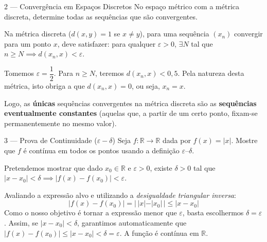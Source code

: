 \begin{exercisebox}{2 --- Convergência em Espaços Discretos}
  No espaço métrico com a métrica discreta, determine todas as sequências que são convergentes.
\end{exercisebox}
\begin{solbox}
  Na métrica discreta ($d(x,y)=1$ se $x \neq y$), para uma sequência $(x_n)$ convergir para um ponto $x$, deve satisfazer: para qualquer $\varepsilon > 0$, $\exists N$ tal que $n \ge N \implies d(x_n, x) < \varepsilon$.
  
  Tomemos $\varepsilon = \dfrac{1}{2}$. Para $n \ge N$, teremos $d(x_n, x) < 0{,}5$. Pela natureza desta métrica, isto obriga a que $d(x_n, x) = 0$, ou seja, $x_n = x$.
  
  Logo, as \textbf{únicas} sequências convergentes na métrica discreta são as \textbf{sequências eventualmente constantes} (aquelas que, a partir de um certo ponto, fixam-se permanentemente no mesmo valor).
\end{solbox}

\begin{exercisebox}{3 --- Prova de Continuidade ($\varepsilon-\delta$)}
  Seja $f:\mathbb{R}\to\mathbb{R}$ dada por $f(x)=|x|$. Mostre que $f$ é contínua em todos os pontos usando a definição $\varepsilon$--$\delta$.
\end{exercisebox}
\begin{solbox}
  Pretendemos mostrar que dado $x_0 \in \mathbb{R}$ e $\varepsilon > 0$, existe $\delta > 0$ tal que $|x - x_0| < \delta \implies |f(x) - f(x_0)| < \varepsilon$.
  
  Avaliando a expressão alvo e utilizando a \textit{desigualdade triangular inversa}:
  \[
    |f(x) - f(x_0)| = |\,|x| - |x_0|\,| \le |x - x_0|
  \]
  Como o nosso objetivo é tornar a expressão menor que $\varepsilon$, basta escolhermos \textbf{$\delta = \varepsilon$}.
  Assim, se $|x - x_0| < \delta$, garantimos automaticamente que $|f(x) - f(x_0)| \le |x - x_0| < \delta = \varepsilon$. A função é contínua em $\mathbb{R}$.
\end{solbox}

